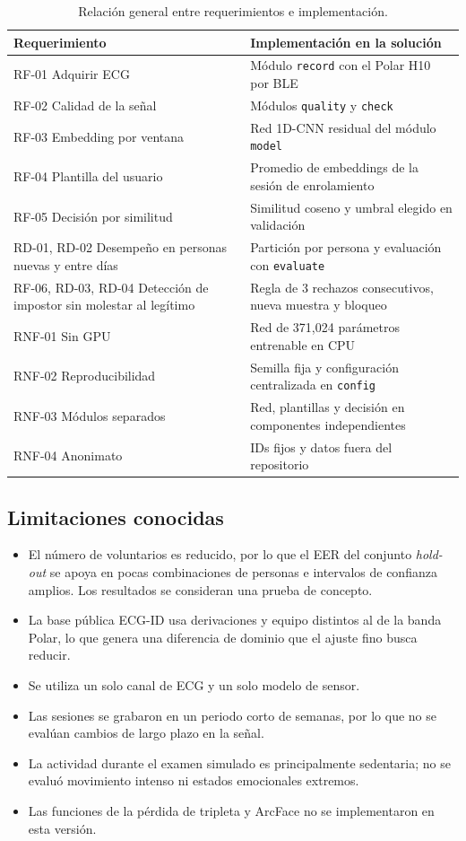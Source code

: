 \begin{table}[htbp]
\centering
\caption{Relación general entre requerimientos e implementación.}
\label{tab:req_impl}
\small
\begin{tabularx}{\textwidth}{l X}
\toprule
\textbf{Requerimiento} & \textbf{Implementación en la solución} \\
\midrule
RF-01 Adquirir ECG & Módulo \texttt{record} con el Polar H10 por BLE \\
RF-02 Calidad de la señal & Módulos \texttt{quality} y \texttt{check} \\
RF-03 Embedding por ventana & Red 1D-CNN residual del módulo \texttt{model} \\
RF-04 Plantilla del usuario & Promedio de embeddings de la sesión de enrolamiento \\
RF-05 Decisión por similitud & Similitud coseno y umbral elegido en validación \\
RD-01, RD-02 Desempeño en personas nuevas y entre días & Partición por persona y evaluación con \texttt{evaluate} \\
RF-06, RD-03, RD-04 Detección de impostor sin molestar al legítimo & Regla de 3 rechazos consecutivos, nueva muestra y bloqueo \\
RNF-01 Sin GPU & Red de 371{,}024 parámetros entrenable en CPU \\
RNF-02 Reproducibilidad & Semilla fija y configuración centralizada en \texttt{config} \\
RNF-03 Módulos separados & Red, plantillas y decisión en componentes independientes \\
RNF-04 Anonimato & IDs fijos y datos fuera del repositorio \\
\bottomrule
\end{tabularx}
\end{table}

\subsection{Limitaciones conocidas}

\begin{itemize}
  \item El número de voluntarios es reducido, por lo que el EER del conjunto \emph{hold-out} se apoya en pocas combinaciones de personas e intervalos de confianza amplios. Los resultados se consideran una prueba de concepto.
  \item La base pública ECG-ID usa derivaciones y equipo distintos al de la banda Polar, lo que genera una diferencia de dominio que el ajuste fino busca reducir.
  \item Se utiliza un solo canal de ECG y un solo modelo de sensor.
  \item Las sesiones se grabaron en un periodo corto de semanas, por lo que no se evalúan cambios de largo plazo en la señal.
  \item La actividad durante el examen simulado es principalmente sedentaria; no se evaluó movimiento intenso ni estados emocionales extremos.
  \item Las funciones de la pérdida de tripleta y ArcFace no se implementaron en esta versión.
\end{itemize}
